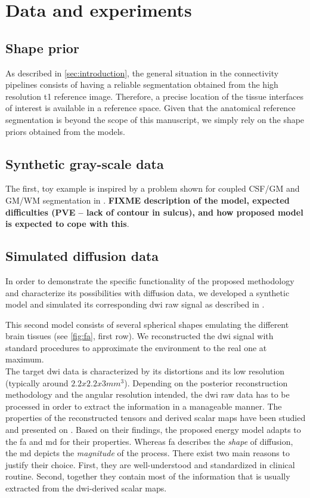 \section{Data and experiments}
\label{sec:experiments}
%
\subsection{Shape prior}
%
As described in \autoref{sec:introduction}, the general situation in
the connectivity pipelines consists of having 
a reliable segmentation obtained from the high resolution \ac{t1} 
reference image. Therefore, a precise location of the tissue interfaces
of interest is available in a reference space. Given that the anatomical 
reference segmentation is beyond the scope of this manuscript, we simply 
rely on the shape priors obtained from the models.

%
\subsection{Synthetic gray-scale data}
%
The first, toy example is inspired by a problem shown for coupled CSF/GM 
and GM/WM segmentation in \cite{MacDonald2000}. \textbf{FIXME description of the model, expected difficulties (PVE -- lack of contour in sulcus), and how proposed model is expected to cope with this}.

%
\subsection{Simulated diffusion data}
%
In order to demonstrate the specific functionality of the proposed
methodology and characterize its possibilities with diffusion data, we developed a
synthetic model and simulated its corresponding \ac{dwi}
raw signal as described in \citep{tuch_q-ball_2004}. 

This second model consists of several spherical shapes emulating
the different brain tissues (see \autoref{fig:fa}, first row). 
We reconstructed the \ac{dwi} signal with standard procedures to 
approximate the environment to the real one at maximum. \\

The target \ac{dwi} data is characterized by its distortions and its
low resolution (typically around $2.2x2.2x3mm^3$). Depending on the
posterior reconstruction methodology and the angular resolution
intended, the \ac{dwi} raw data has to be processed in order to
extract the information in a manageable manner. The properties of
the reconstructed tensors and derived scalar maps have been
studied and presented on \cite{ennis_orthogonal_2006}. Based on their
findings, the proposed energy model adapts to the \ac{fa} and \ac{md}
for their properties.
Whereas \ac{fa} describes the \emph{shape} of diffusion, 
the \ac{md} depicts the \emph{magnitude} of the process. 
There exist two main reasons to justify their choice. 
First, they are well-understood and standardized in clinical routine.
Second, together they contain most of the information that is
usually extracted from the \ac{dwi}-derived scalar maps. \\

